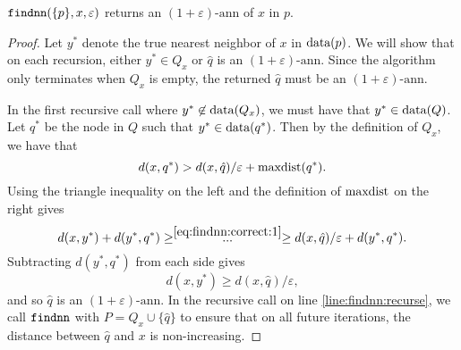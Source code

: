 \documentclass[thesis.tex]{subfiles}
\newcommand{\dist}[2]{\distf({#1},{#2})}
\newcommand{\distf}{d}
\newcommand{\eann}{(1+\varepsilon)\text{-ann}}
\newcommand{\q}{\ensuremath q}
\newcommand{\mkfunction}[1]{\ifmmode{\textnormal{{#1}}}}
\newcommand{\maxdist}[1]    {\mkfunction{maxdist}({#1})}
\newcommand{\data}[1]       {\mkfunction{data}({#1})}
\newcommand{\findnn}{\mkprocedure{findnn}}
\begin{document}
\begin{theorem}
    \label{theorem:findnn:correct}
    $\findnn(\{p\},x,\varepsilon)$ returns an $\eann$ of $x$ in $p$.
\end{theorem}
\begin{proof}
    Let $y^*$ denote the true nearest neighbor of $x$ in $\data{p}$.
    We will show that on each recursion,
    either $y^* \in Q_x$ or $\hat q$ is an $\eann$.
    Since the algorithm only terminates when $Q_x$ is empty,
    the returned $\hat q$ must be an $\eann$.

    In the first recursive call where $y^* \not\in\data{Q_x}$,
    we must have that $y^* \in \data{Q}$.
    Let $q^*$ be the node in $Q$ such that $y^* \in\data{\q^*}$.
    Then by the definition of $Q_x$, we have that
    \begin{equation}
        \label{eq:findnn:correct:1}
        \dist{x}{q^*}
        > \dist{x}{\hat q}/\varepsilon + \maxdist{q^*} 
        .
    \end{equation}
    Using the triangle inequality on the left and the definition of $\mkfunction{maxdist}$ on the right gives
    \begin{equation}
        \dist{x}{y^*} + \dist{y^*}{q^*} 
        \ge \stackrel{\eqref{eq:findnn:correct:1}}{~~~~...~~~~}
        \ge \dist{x}{\hat q}/\varepsilon + \dist{y^*}{q^*}
        .
    \end{equation}
    Subtracting $\dist{y^*}{q^*}$ from each side gives
    \begin{equation}
        \dist{x}{y^*} \ge \dist{x}{\hat q}/\varepsilon
        ,
    \end{equation}
    and so $\hat q$ is an $\eann$.
    In the recursive call on line \ref{line:findnn:recurse},
    we call $\findnn$ with $P=Q_x\cup\{\hat q\}$ to ensure that on all future iterations,
    the distance between $\hat q$ and $x$ is non-increasing.
\end{proof}
\end{document}
